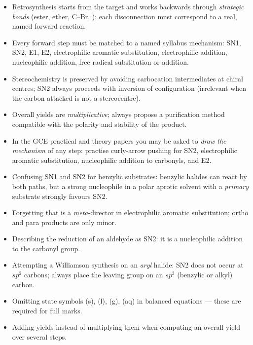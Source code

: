 \documentclass[11pt]{article}
\newcommand{\cle}[1]{{\popxbold\color{popdark}#1}}
\begin{document}
\begin{aretenir}
\begin{itemize}
    \item Retrosynthesis starts from the target and works backwards through \emph{strategic bonds} (ester, ether, C--Br, ); each disconnection must correspond to a real, named forward reaction.
    \item Every forward step must be matched to a named syllabus mechanism: \cle{SN1}, \cle{SN2}, \cle{E1}, \cle{E2}, electrophilic aromatic substitution, electrophilic addition, nucleophilic addition, free radical substitution or addition.
    \item Stereochemistry is preserved by avoiding carbocation intermediates at chiral centres; \cle{SN2} always proceeds with inversion of configuration (irrelevant when the carbon attacked is not a stereocentre).
    \item Overall yields are \emph{multiplicative}; always propose a purification method compatible with the polarity and stability of the product.
    \item In the GCE practical and theory papers you may be asked to \emph{draw the mechanism} of any step: practise curly-arrow pushing for \cle{SN2}, electrophilic aromatic substitution, nucleophilic addition to carbonyls, and \cle{E2}.
\end{itemize}
\end{aretenir}

\begin{attention}
\begin{itemize}
    \item Confusing \cle{SN1} and \cle{SN2} for benzylic substrates: benzylic halides can react by both paths, but a strong nucleophile in a polar aprotic solvent with a \emph{primary} substrate strongly favours \cle{SN2}.
    \item Forgetting that  is a \emph{meta}-director in electrophilic aromatic substitution; ortho and para products are only minor.
    \item Describing the  reduction of an aldehyde as \cle{SN2}: it is a \cle{nucleophilic addition} to the carbonyl group.
    \item Attempting a Williamson synthesis on an \emph{aryl} halide: \cle{SN2} does not occur at $sp^2$ carbons; always place the leaving group on an $sp^3$ (benzylic or alkyl) carbon.
    \item Omitting state symbols (s), (l), (g), (aq) in balanced equations --- these are required for full marks.
    \item Adding yields instead of multiplying them when computing an overall yield over several steps.
\end{itemize}
\end{attention}
\end{document}
